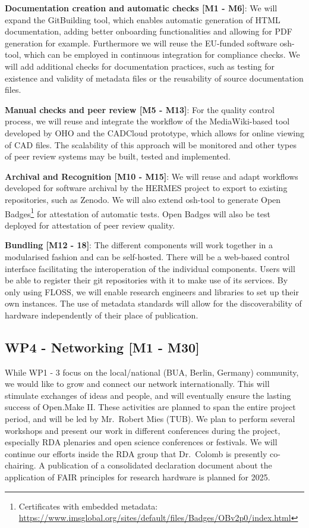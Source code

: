 \documentclass[
  12pt,
  a4paper,
]{article}
\begin{document}
\textbf{Documentation creation and automatic checks {[}M1 - M6{]}}: We
will expand the GitBuilding tool, which enables automatic generation of
HTML documentation, adding better onboarding functionalities and
allowing for PDF generation for example. Furthermore we will reuse the
EU-funded software osh-tool, which can be employed in continuous
integration for compliance checks. We will add additional checks for
documentation practices, such as testing for existence and validity of
metadata files or the reusability of source documentation files.

\textbf{Manual checks and peer review {[}M5 - M13{]}}: For the quality
control process, we will reuse and integrate the workflow of the
MediaWiki-based tool developed by OHO and the CADCloud prototype, which
allows for online viewing of CAD files. The scalability of this approach
will be monitored and other types of peer review systems may be built,
tested and implemented.

\textbf{Archival and Recognition {[}M10 - M15{]}}: We will reuse and
adapt workflows developed for software archival by the HERMES project to
export to existing repositories, such as Zenodo. We will also extend
osh-tool to generate Open Badges\footnote{Certificates with embedded
  metadata:
  \url{https://www.imsglobal.org/sites/default/files/Badges/OBv2p0/index.html}}
for attestation of automatic tests. Open Badges will also be test
deployed for attestation of peer review quality.

\textbf{Bundling {[}M12 - 18{]}}: The different components will work
together in a modularised fashion and can be self-hosted. There will be
a web-based control interface facilitating the interoperation of the
individual components. Users will be able to register their git
repositories with it to make use of its services. By only using FLOSS,
we will enable research engineers and libraries to set up their own
instances. The use of metadata standards will allow for the
discoverability of hardware independently of their place of publication.

\hypertarget{wp4---networking-m1---m30}{%
\subsection{WP4 - Networking {[}M1 -
M30{]}}\label{wp4---networking-m1---m30}}

While WP1 - 3 focus on the local/national (BUA, Berlin, Germany)
community, we would like to grow and connect our network
internationally. This will stimulate exchanges of ideas and people, and
will eventually ensure the lasting success of Open.Make II. These
activities are planned to span the entire project period, and will be
led by Mr.~Robert Mies (TUB). We plan to perform several workshops and
present our work in different conferences during the project, especially
RDA plenaries and open science conferences or festivals. We will
continue our efforts inside the RDA group that Dr.~Colomb is presently
co-chairing. A publication of a consolidated declaration document about
the application of FAIR principles for research hardware is planned for
2025.
\end{document}
